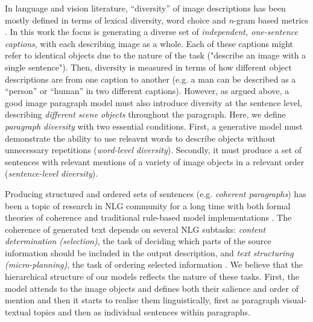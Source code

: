 \documentclass[11pt,a4paper]{article}
\newcommand{\kibitz}[2]{\ifnum\Comments=1\textcolor{#1}{#2}\fi}
\newcommand{\nikolai}[1]{\kibitz{red}   {[Nikolai: #1]}}
\begin{document}
In language and vision literature, ``diversity'' of image descriptions has been mostly defined in terms of lexical diversity, word choice and \textit{n}-gram based metrics \cite{Devlin2015, Vijayakumar2016, Lindh2018, VanMiltenburg2018}.
In this work the focus is generating a diverse set of \textit{independent, one-sentence captions}, with each describing image as a whole.
Each of these captions might refer to identical objects due to the nature of the task ("describe an image with a single sentence"). Then, diversity is measured in terms of how different object descriptions are from one caption to another (e.g. a man can be described as a ``person'' or ``human'' in two different captions).
However, as argued above, a good image paragraph model must also introduce diversity at the sentence level, describing \textit{different scene objects} throughout the paragraph. %
Here, we define \textit{paragraph diversity} with two essential conditions. First, a generative model must demonstrate the ability to use %
releavnt words to describe objects without unnecessary repetitions (\emph{word-level diversity}).
Secondly, it must produce a set of sentences with relevant mentions of a variety of image objects in a relevant order (\emph{sentence-level diversity}). 


Producing structured and ordered sets of sentences (e.g. \textit{coherent paragraphs}) has been a topic of research in NLG community for a long time with both formal theories of coherence \cite{grosz95,Barzilay2008} and traditional rule-based model implementations \cite{Reiter00buildingnatural}.
The coherence of generated text depends on several NLG subtasks: \textit{content determination (selection)}, the task of deciding which parts of the source information should be included in the output description, and \textit{text structuring (micro-planning)}, the task of ordering selected information \cite{Gatt2017}.
We believe that the hierarchical structure of our models reflects the nature of these tasks. First, the model attends to the image objects and defines both their salience and order of mention and then it starts to realise them linguistically, first as paragraph visual-textual topics and then as individual sentences within paragraphs.
\end{document}
